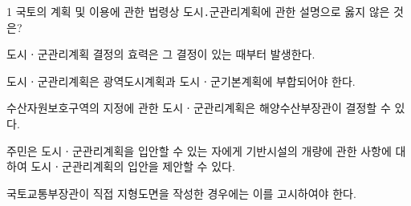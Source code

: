 \begin{question}{1}
국토의 계획 및 이용에 관한 법령상 도시․군관리계획에 관한 설명으로 옳지 않은 것은?
\begin{choices}
  \item 도시ㆍ군관리계획 결정의 효력은 그 결정이 있는 때부터 발생한다.
  \item 도시ㆍ군관리계획은 광역도시계획과 도시ㆍ군기본계획에 부합되어야 한다.
  \item 수산자원보호구역의 지정에 관한 도시ㆍ군관리계획은 해양수산부장관이 결정할 수 있다.
  \item 주민은 도시ㆍ군관리계획을 입안할 수 있는 자에게 기반시설의 개량에 관한 사항에 대하여 도시ㆍ군관리계획의 입안을 제안할 수 있다.
  \item 국토교통부장관이 직접 지형도면을 작성한 경우에는 이를 고시하여야 한다.
\end{choices}
\end{question}
